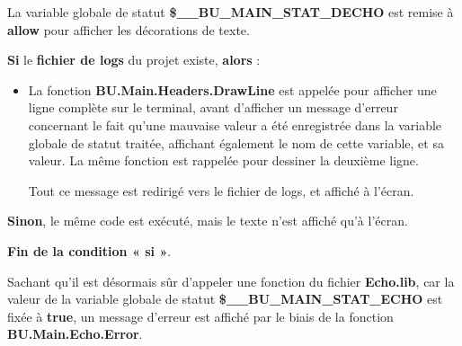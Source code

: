 \documentclass[a4paper,10pt]{article}
\begin{document}
    \setlength{\parskip}{1em}

    \begin{justify}
        La variable globale de statut \textbf{\color{vars}\$\_\_BU\_MAIN\_STAT\_DECHO} est remise à \textbf{allow} pour afficher les décorations de texte.
    \end{justify}

    \setlength{\parskip}{2em}

    \begin{justify}
        \textbf{\color{cond}Si} le \textbf{\color{path}fichier de logs} du projet existe, \textbf{\color{cond}alors} :

        \setlength{\parskip}{1em}

        \begin{itemize}
            \item
            {
                \begin{justify}
                    La fonction \textbf{\color{func}BU.Main.Headers.DrawLine} est appelée pour afficher une ligne complète sur le terminal, avant d'afficher un message d'erreur concernant le fait qu'une mauvaise valeur a été enregistrée dans la variable globale de statut traitée, affichant également le nom de cette variable, et sa valeur. La même fonction est rappelée pour dessiner la deuxième ligne.
                \end{justify}

                \setlength{\parskip}{1em}

                \begin{justify}
                    Tout ce message est redirigé vers le fichier de logs, et affiché à l'écran.
                \end{justify}
            }
        \end{itemize}
    \end{justify}

    \setlength{\parskip}{1em}

    \begin{justify}
        \textbf{\color{cond}Sinon}, le même code est exécuté, mais le texte n'est affiché qu'à l'écran.
    \end{justify}

    \begin{justify}
        \textbf{\color{cond}Fin de la condition « si »}.
    \end{justify}

    \setlength{\parskip}{2em}


    \begin{justify}
        Sachant qu'il est désormais sûr d'appeler une fonction du fichier \textbf{\color{path}Echo.lib}, car la valeur de la variable globale de statut \textbf{\color{vars}\$\_\_BU\_MAIN\_STAT\_ECHO} est fixée à \textbf{true}, un message d'erreur est affiché par le biais de la fonction \textbf{\color{func}BU.Main.Echo.Error}.
    \end{justify}
\end{document}
